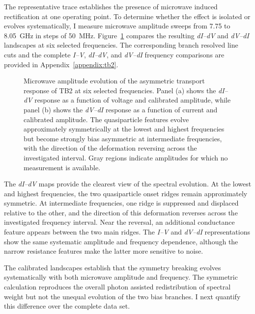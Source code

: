         The representative trace establishes the presence of microwave induced rectification at one operating point. To determine whether the effect is isolated or evolves systematically, I measure microwave amplitude sweeps from 7.75 to \qty{8.05}{\giga\hertz} in steps of \qty{50}{\mega\hertz}. Figure~\ref{fig:tb:asym:comparison-maps} compares the resulting \textit{dI--dV} and \textit{dV--dI} landscapes at six selected frequencies. The corresponding branch resolved line cuts and the complete \textit{I--V}, \textit{dI--dV}, and \textit{dV--dI} frequency comparisons are provided in Appendix~\ref{appendix:tb2}.

        \begin{figure}[p]
            \centering
            \hfill
            \caption{
                Microwave amplitude evolution of the asymmetric transport response of TB2 at six selected frequencies. Panel (a) shows the \textit{dI--dV} response as a function of voltage and calibrated amplitude, while panel (b) shows the \textit{dV--dI} response as a function of current and calibrated amplitude. The quasiparticle features evolve approximately symmetrically at the lowest and highest frequencies but become strongly bias asymmetric at intermediate frequencies, with the direction of the deformation reversing across the investigated interval. Gray regions indicate amplitudes for which no measurement is available.
            }
            \label{fig:tb:asym:comparison-maps}
        \end{figure}

        The \textit{dI--dV} maps provide the clearest view of the spectral evolution. At the lowest and highest frequencies, the two quasiparticle onset ridges remain approximately symmetric. At intermediate frequencies, one ridge is suppressed and displaced relative to the other, and the direction of this deformation reverses across the investigated frequency interval. Near the reversal, an additional conductance feature appears between the two main ridges. The \textit{I--V} and \textit{dV--dI} representations show the same systematic amplitude and frequency dependence, although the narrow resistance features make the latter more sensitive to noise.

        The calibrated landscapes establish that the symmetry breaking evolves systematically with both microwave amplitude and frequency. The symmetric calculation reproduces the overall photon assisted redistribution of spectral weight but not the unequal evolution of the two bias branches. I next quantify this difference over the complete data set.

